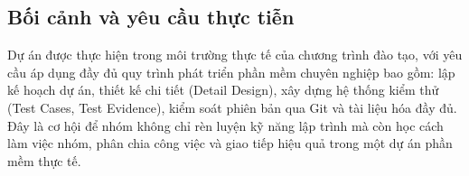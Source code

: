\subsection{Bối cảnh và yêu cầu thực tiễn}
Dự án được thực hiện trong môi trường thực tế của chương trình đào tạo, với yêu cầu áp dụng đầy đủ quy trình phát triển phần mềm chuyên nghiệp bao gồm: lập kế hoạch dự án, thiết kế chi tiết (Detail Design), xây dựng hệ thống kiểm thử (Test Cases, Test Evidence), kiểm soát phiên bản qua Git và tài liệu hóa đầy đủ. Đây là cơ hội để nhóm không chỉ rèn luyện kỹ năng lập trình mà còn học cách làm việc nhóm, phân chia công việc và giao tiếp hiệu quả trong một dự án phần mềm thực tế.
